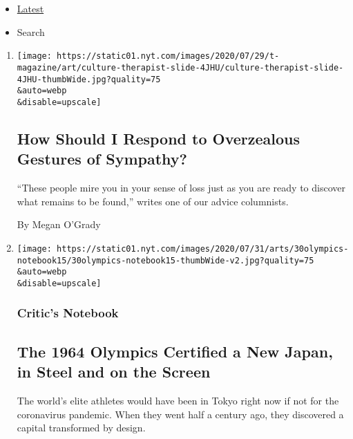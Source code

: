 \begin{itemize}
\tightlist
\item
  \protect\hyperlink{stream-panel}{Latest}
\item
  Search
\end{itemize}

\begin{enumerate}
\def\labelenumi{\arabic{enumi}.}
\item
  \href{/2020/07/31/t-magazine/culture-therapist-grief.html}{}

  \texttt{[image: https://static01.nyt.com/images/2020/07/29/t-magazine/art/culture-therapist-slide-4JHU/culture-therapist-slide-4JHU-thumbWide.jpg?quality=75\\\&auto=webp\\\&disable=upscale]}

  \hypertarget{how-should-i-respond-to-overzealous-gestures-of-sympathy}{%
  \subsection{How Should I Respond to Overzealous Gestures of
  Sympathy?}\label{how-should-i-respond-to-overzealous-gestures-of-sympathy}}

  ``These people mire you in your sense of loss just as you are ready to
  discover what remains to be found,'' writes one of our advice
  columnists.

  By Megan O'Grady
\item
  \href{/2020/07/30/arts/design/tokyo-olympics-1964-design.html}{}

  \texttt{[image: https://static01.nyt.com/images/2020/07/31/arts/30olympics-notebook15/30olympics-notebook15-thumbWide-v2.jpg?quality=75\\\&auto=webp\\\&disable=upscale]}

  \hypertarget{critics-notebook}{%
  \subsubsection{Critic's Notebook}\label{critics-notebook}}

  \hypertarget{the-1964-olympics-certified-a-new-japan-in-steel-and-on-the-screen}{%
  \subsection{The 1964 Olympics Certified a New Japan, in Steel and on
  the
  Screen}\label{the-1964-olympics-certified-a-new-japan-in-steel-and-on-the-screen}}

  The world's elite athletes would have been in Tokyo right now if not
  for the coronavirus pandemic. When they went half a century ago, they
  discovered a capital transformed by design.


\end{enumerate}
